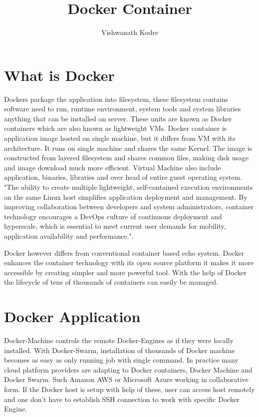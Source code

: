 \documentclass[9pt,twocolumn,twoside]{../../styles/osajnl}
\title{Docker Container}
\author[1,*]{Vishwanath Kodre}
\affil[1]{School of Informatics and Computing, Bloomington, IN 47408, U.S.A.}
\affil[*]{Corresponding authors: vkodre@iu.edu}
\begin{document}
\maketitle

\section{What is Docker}
Dockers package the application into filesystem, these filesystem contains software need to run, runtime environment, system tools and system libraries anything that can be installed on server. These units are known as Docker containers which are also known as lightweight VMs. Docker container is application image hosted on single machine, but it differs from VM with its architecture. It runs on single machine and shares the same Kernel. The image is constructed from layered filesystem and shares common files, making disk usage and image download much more efficient. Virtual Machine also include application, binaries, libraries and over head of entire guest operating system. "The ability to create multiple lightweight, self-contained execution environments on the same Linux host simplifies application deployment and management. By improving collaboration between developers and system administrators, container technology encourages a DevOps culture of continuous deployment and hyperscale, which is essential to meet current user demands for mobility, application availability and performance."\cite{DockerandtheLinuxcontainerecosystem}.

Docker however differs from conventional container based echo system. Docker enhances the container technology with its open source platform it makes it more accessible by creating simpler and more powerful tool. With the help of Docker the lifecycle of tens of thousands of containers can easily be managed.

\section{Docker Application}
Docker-Machine controls the remote Docker-Engines as if they were locally installed. With Docker-Swarm, installation of thousands of Docker machine becomes as easy as only running job with single command. In practice many cloud platform providers are adapting to Docker containers, Docker Machine and Docker Swarm. Such Amazon AWS or Microsoft Azure working in collaborative form. If the Docker host is setup with help of these, user can access host remotely and one don't have to establish SSH connection to work with specific Docker Engine.
\end{document}
